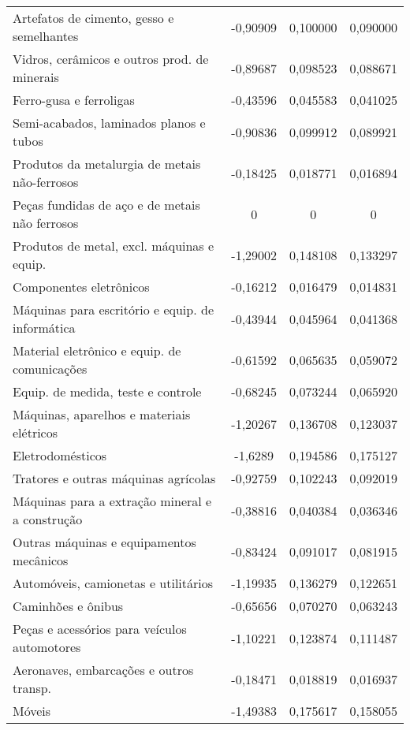 \begin{apendicesenv}
\begin{small}
\begin{center}
\begin{longtable}{m{8cm}ccc}
				Artefatos de cimento, gesso e semelhantes          & -0,90909 & 0,100000 & 0,090000 \\
				Vidros, cerâmicos e outros prod. de minerais       & -0,89687 & 0,098523 & 0,088671 \\
				Ferro-gusa e ferroligas                            & -0,43596 & 0,045583 & 0,041025 \\
				Semi-acabados, laminados planos e tubos            & -0,90836 & 0,099912 & 0,089921 \\
				Produtos da metalurgia de metais não-ferrosos      & -0,18425 & 0,018771 & 0,016894 \\
				Peças fundidas de aço e de metais não ferrosos     & 0 & 0 & 0 \\
				Produtos de metal, excl. máquinas e equip.         & -1,29002 & 0,148108 & 0,133297 \\
				Componentes eletrônicos                            & -0,16212 & 0,016479 & 0,014831 \\
				Máquinas para escritório e equip. de informática   & -0,43944 & 0,045964 & 0,041368 \\
				Material eletrônico e equip. de comunicações       & -0,61592 & 0,065635 & 0,059072 \\
				Equip. de medida, teste e controle                 & -0,68245 & 0,073244 & 0,065920 \\
				Máquinas, aparelhos e materiais elétricos          & -1,20267 & 0,136708 & 0,123037 \\
				Eletrodomésticos                                   & -1,6289 & 0,194586 & 0,175127 \\
				Tratores e outras máquinas agrícolas               & -0,92759 & 0,102243 & 0,092019 \\
				Máquinas para a extração mineral e a construção    & -0,38816 & 0,040384 & 0,036346 \\
				Outras máquinas e equipamentos mecânicos           & -0,83424 & 0,091017 & 0,081915 \\
				Automóveis, camionetas e utilitários               & -1,19935 & 0,136279 & 0,122651 \\
				Caminhões e ônibus                                 & -0,65656 & 0,070270 & 0,063243 \\
				Peças e acessórios para veículos automotores       & -1,10221 & 0,123874 & 0,111487 \\
				Aeronaves, embarcações e outros transp.            & -0,18471 & 0,018819 & 0,016937 \\
				Móveis                                             & -1,49383 & 0,175617 & 0,158055 \\

\end{longtable}
\end{center}
\end{small}
\end{apendicesenv}
